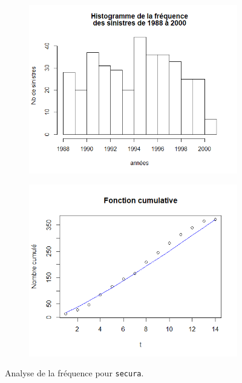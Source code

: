 		\begin{figure}[H]
			\begin{center}
				\begin{subfigure}[b]{0.45\textwidth}
					\includegraphics[scale=0.45]{Graphiques/Hist_freq_Secura} 
					\caption{} \label{Hist_freq_Secura}
				\end{subfigure}
				\begin{subfigure}[b]{0.4\textwidth}
					\includegraphics[scale=0.45]{Graphiques/Graph_Secura_FreqCumul} 
					\caption{} \label{Graph_Secura_FreqCumul}
				\end{subfigure}
			\renewcommand{\figurename}{Illustration}
			\caption{Analyse de la fréquence pour \texttt{secura}.}\label{Graph_freq_Secura}
			\end{center}
		\end{figure}
	
